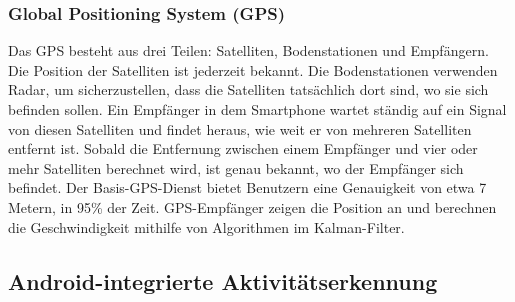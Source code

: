 %
%
%
%

\subsubsection{Global Positioning System (GPS)}

Das GPS besteht aus drei Teilen: Satelliten, Bodenstationen und Empfängern. Die Position der Satelliten ist jederzeit bekannt. Die Bodenstationen verwenden Radar, um sicherzustellen, dass die Satelliten tatsächlich dort sind, wo sie sich befinden sollen.
Ein Empfänger in dem Smartphone wartet ständig auf ein Signal von diesen Satelliten und findet heraus, wie weit er von mehreren Satelliten entfernt ist. Sobald die Entfernung zwischen einem Empfänger und vier oder mehr Satelliten berechnet wird, ist genau bekannt, wo der Empfänger sich befindet. Der Basis-GPS-Dienst bietet Benutzern eine Genauigkeit von etwa 7 Metern, in 95\% der Zeit. GPS-Empfänger zeigen die Position an und berechnen die Geschwindigkeit mithilfe von Algorithmen im Kalman-Filter.\citep{Nasa2019}\citep{FAAGPS}\citep{YeazelGPS}

%
%
%
%

\subsection{Android-integrierte Aktivitätserkennung}

